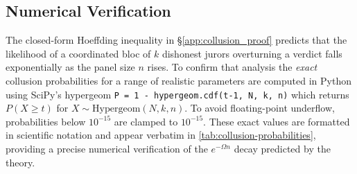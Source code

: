 \documentclass{article}
\begin{document}
\subsection{Numerical Verification}
\label{app:collusion_tables}

The closed-form Hoeffding inequality in \S\ref{app:collusion_proof} predicts that the likelihood of a coordinated bloc of $k$ dishonest jurors overturning a verdict falls exponentially as the panel size $n$ rises. To confirm that analysis the \textit{exact} collusion probabilities for a range of realistic parameters are computed in Python using  SciPy’s hypergeom \texttt{P = 1 - hypergeom.cdf(t-1, N, k, n)} which returns $P(X\ge t)$ for $X\sim\mathrm{Hypergeom}(N,k,n)$.  To avoid floating-point underflow, probabilities below $10^{-15}$ are clamped to $10^{-15}$.  These exact values are formatted in scientific notation and appear verbatim in \autoref{tab:collusion-probabilities}, providing a precise numerical verification of the $e^{-\Omega n}$ decay predicted by the theory.
\end{document}
